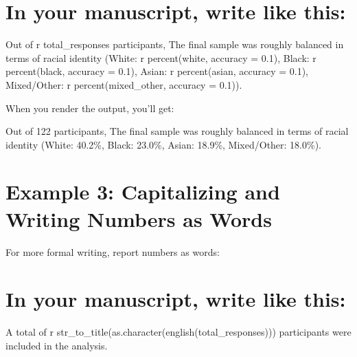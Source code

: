\documentclass[
  english,
  letterpaper,
  DIV=11,
  numbers=noendperiod]{scrreprt}
\newenvironment{Shaded}{\begin{snugshade}}{\end{snugshade}}
\newcommand{\InformationTok}[1]{\textcolor[rgb]{0.37,0.37,0.37}{#1}}
\newcommand{\NormalTok}[1]{\textcolor[rgb]{0.00,0.23,0.31}{#1}}
\begin{document}
\section{In your manuscript, write like
this:}\label{in-your-manuscript-write-like-this-1}

\begin{Shaded}
\begin{Highlighting}[]
\NormalTok{Out of }\InformationTok{\textasciigrave{}r total\_responses\textasciigrave{}}\NormalTok{ participants, The final sample was roughly balanced in terms of }
\NormalTok{racial identity (White: }\InformationTok{\textasciigrave{}r percent(white, accuracy = 0.1)\textasciigrave{}}\NormalTok{, }
\NormalTok{                 Black: }\InformationTok{\textasciigrave{}r percent(black, accuracy = 0.1)\textasciigrave{}}\NormalTok{,}
\NormalTok{                 Asian: }\InformationTok{\textasciigrave{}r percent(asian, accuracy = 0.1)\textasciigrave{}}\NormalTok{, }
\NormalTok{                 Mixed/Other: }\InformationTok{\textasciigrave{}r percent(mixed\_other, accuracy = 0.1)\textasciigrave{}}\NormalTok{).}
\end{Highlighting}
\end{Shaded}

When you render the output, you'll get:

\begin{Shaded}
\begin{Highlighting}[]
\NormalTok{Out of 122 participants, The final sample was roughly balanced in terms of racial identity}
\NormalTok{(White: 40.2\%, Black: 23.0\%, Asian: 18.9\%, Mixed/Other: 18.0\%).}
\end{Highlighting}
\end{Shaded}

\section{Example 3: Capitalizing and Writing Numbers as
Words}\label{example-3-capitalizing-and-writing-numbers-as-words}

For more formal writing, report numbers as words:

\section{In your manuscript, write like
this:}\label{in-your-manuscript-write-like-this-2}

\begin{Shaded}
\begin{Highlighting}[]
\NormalTok{A total of }\InformationTok{\textasciigrave{}r str\_to\_title(as.character(english(total\_responses)))\textasciigrave{}}\NormalTok{ participants were included in the analysis.}
\end{Highlighting}
\end{Shaded}
\end{document}
